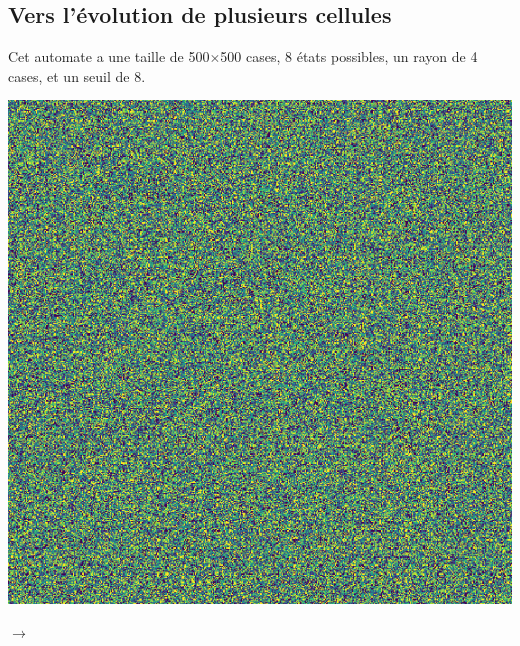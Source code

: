 \documentclass[12pt, a4paper]{article}
\begin{document}
        \subsection{Vers l'évolution de plusieurs cellules}
            \begin{flushleft}
                Cet automate a une taille de 500$\times$500 cases, 8 états possibles, un rayon de 4 cases, et un seuil de 8.
            \end{flushleft}
            \begin{center}
                \begin{minipage}{.17\linewidth}
                    \includegraphics[scale=0.15]{img/part3/1/step1.png}
                \end{minipage}
                $\rightarrow$
                \begin{minipage}{.17\linewidth}

\end{minipage}
\end{center}
\end{document}
